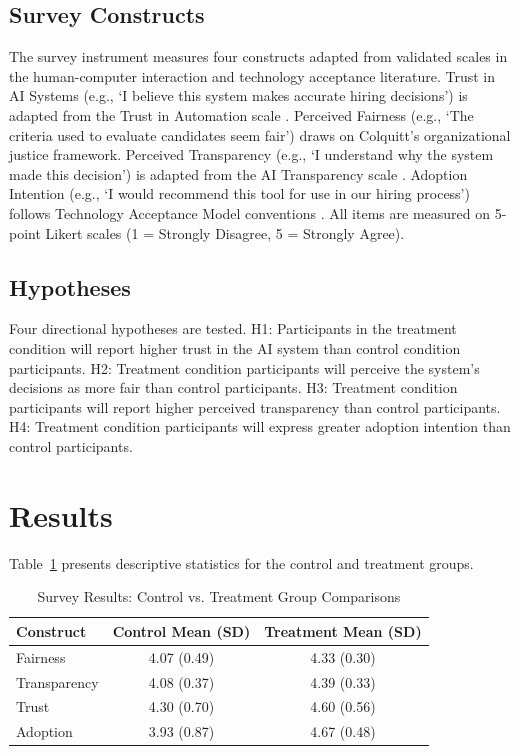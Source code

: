 \documentclass[conference]{IEEEtran}
\begin{document}
\subsection{Survey Constructs}

The survey instrument measures four constructs adapted from validated scales in the human-computer interaction and technology acceptance literature. Trust in AI Systems (e.g., `I believe this system makes accurate hiring decisions') is adapted from the Trust in Automation scale \cite{jian2000}. Perceived Fairness (e.g., `The criteria used to evaluate candidates seem fair') draws on Colquitt's \cite{colquitt2001} organizational justice framework. Perceived Transparency (e.g., `I understand why the system made this decision') is adapted from the AI Transparency scale \cite{wang2021}. Adoption Intention (e.g., `I would recommend this tool for use in our hiring process') follows Technology Acceptance Model conventions \cite{davis1989}. All items are measured on 5-point Likert scales (1 = Strongly Disagree, 5 = Strongly Agree).

\subsection{Hypotheses}

Four directional hypotheses are tested. H1: Participants in the treatment condition will report higher trust in the AI system than control condition participants. H2: Treatment condition participants will perceive the system's decisions as more fair than control participants. H3: Treatment condition participants will report higher perceived transparency than control participants. H4: Treatment condition participants will express greater adoption intention than control participants.

\section{Results}

Table~\ref{tab:surveyresults} presents descriptive statistics for the control and treatment groups.

\begin{table}[htbp]
\caption{Survey Results: Control vs. Treatment Group Comparisons}
\begin{center}
\begin{tabular}{|l|c|c|}
\hline
\textbf{Construct} & \textbf{Control Mean (SD)} & \textbf{Treatment Mean (SD)} \\
\hline
Fairness & 4.07 (0.49) & 4.33 (0.30) \\
\hline
Transparency & 4.08 (0.37) & 4.39 (0.33) \\
\hline
Trust & 4.30 (0.70) & 4.60 (0.56) \\
\hline
Adoption & 3.93 (0.87) & 4.67 (0.48) \\
\hline
\end{tabular}
\label{tab:surveyresults}
\end{center}
\end{table}
\end{document}
